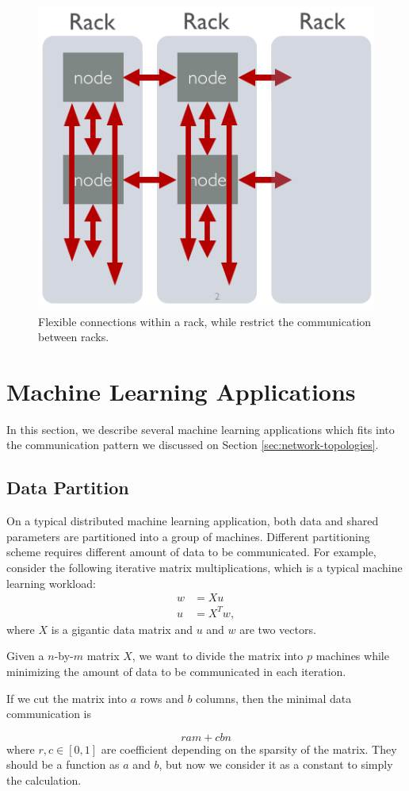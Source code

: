 \documentclass[11pt, twocolumn]{article}
\begin{document}
\begin{figure}[th!]
  \centering
  \includegraphics[width=.45\textwidth]{fig/rack}
  \caption{Flexible connections within a rack, while restrict the communication
    between racks. }
  \label{fig:rack}
\end{figure}

\section{Machine Learning Applications}

In this section, we describe several machine learning applications which fits
into the communication pattern we discussed on Section
\ref{sec:network-topologies}.

\subsection{Data Partition}

On a typical distributed machine learning application, both data and shared
parameters are partitioned into a group of machines.
Different partitioning scheme requires different amount of data to be
communicated. For example, consider the following iterative matrix
multiplications, which is a typical machine learning workload:
\begin{align*}
w &= X u \\
u &= X^T w,
\end{align*}
where $X$ is a gigantic data matrix and $u$ and $w$ are two vectors.

Given a $n$-by-$m$ matrix $X$, we want to divide the matrix into $p$ machines
while minimizing the amount of data to be communicated in each iteration.

If we cut the matrix into $a$ rows and $b$ columns, then the minimal data
communication is

\begin{equation}
  r  am +  c bn
  \label{eq:total-traffic}
\end{equation}
where $r,c \in [0,1]$ are coefficient depending on the sparsity of the
matrix. They should be a function as $a$ and $b$, but now we consider it as a
constant to simply the calculation.
\end{document}

